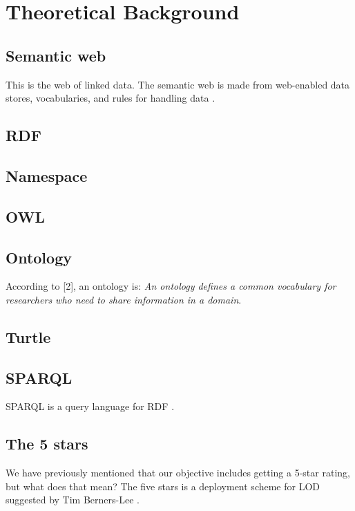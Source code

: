 \chapter{Theoretical Background}

\section{Semantic web}
This is the web of linked data. The semantic web is made from web-enabled data stores, vocabularies, and rules for handling data \cite{semantic}. 

\section{RDF}

\section{Namespace}

\section{OWL}

\section{Ontology}
According to [2], an ontology is: \textit{An ontology defines a common vocabulary for researchers who need to share information in a domain}. 

\section{Turtle}

\section{SPARQL}
SPARQL is a query language for RDF \cite{sparql}.

\section{The 5 stars}
We have previously mentioned that our objective includes getting a 5-star rating, but what does that mean? The five stars is a deployment scheme for LOD suggested by Tim Berners-Lee \cite{lod}.
